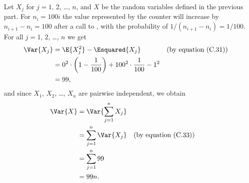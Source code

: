 Let $X_j$ for $j=1$, 2, \dots, $n$, and $X$ be the random variables defined in the previous part.
For $n_i=100i$ the value represented by the counter will increase by $n_{i+1}-n_i=100$ after a call to , with the probability of $1/(n_{i+1}-n_i)=1/100$.
For all $j=1$, 2, \dots, $n$ we get
\begin{align*}
    \Var{X_j} &= \E{X_j^2}-\Esquared{X_j} && \text{(by equation (C.31))} \\
    &= 0^2\cdot\left(1-\frac{1}{100}\right)+100^2\cdot\frac{1}{100}-1^2 \\
    &= 99,
\end{align*}
and since $X_1$, $X_2$, \dots, $X_n$ are pairwise independent, we obtain
\begin{align*}
    \Var{X} &= \Var{\sum_{j=1}^nX_j} \\
    &= \sum_{j=1}^n\Var{X_j} && \text{(by equation (C.33))} \\
    &= \sum_{j=1}^n99 \\
    &= 99n.
\end{align*}
